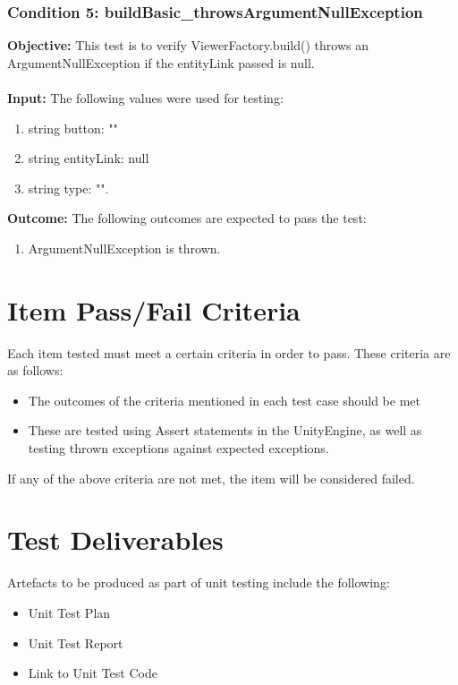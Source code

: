 \documentclass[a4paper,12pt]{article}
\begin{document}
		\subsubsection{Condition 5: buildBasic\_throwsArgumentNullException}
			\textbf{Objective:} This test is to verify ViewerFactory.build() throws an ArgumentNullException if the entityLink passed is null.\\\\
			\textbf{Input:} The following values were used for testing:
				\begin{enumerate}
					\item string button: ""
					\item string entityLink: null
					\item string type: "".
				\end{enumerate}
			\textbf{Outcome:} The following outcomes are expected to pass the test:
				\begin{enumerate}
					\item ArgumentNullException is thrown.
				\end{enumerate}

\section{Item Pass/Fail Criteria}

	Each item tested must meet a certain criteria in order to pass. These criteria are as follows: 
		\begin{itemize}
			\item The outcomes of the criteria mentioned in each test case should be met
			\item These are tested using Assert statements in the UnityEngine, as well as testing thrown exceptions against expected exceptions.
		\end{itemize}
	If any of the above criteria are not met, the item will be considered failed.

\section{Test Deliverables}
	Artefacts to be produced as part of unit testing include the following:
		\begin{itemize}
			\item Unit Test Plan
			\item Unit Test Report
			\item Link to Unit Test Code
		\end{itemize}
\end{document}
